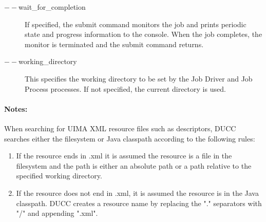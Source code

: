 \begin{description}
           \item[$--$wait\_for\_completion ]             
             If specified, the submit command monitors the job and prints periodic
             state and progress information to the console.  When the job completes, the monitor
             is terminated and the submit command returns.
             
           \item[$--$working\_directory ]             
             This specifies the working directory to be set by the Job Driver and Job Process processes. 
             If not specified, the current directory is used.
  \end{description}
             
  \paragraph{Notes:}
  \label{par:cli.submit.notes}
  When searching for UIMA XML resource files such as descriptors, DUCC searches either the 
  filesystem or Java classpath according to the following rules:
  \begin{enumerate}
    \item If the resource ends in .xml it is assumed the resource is a file in the filesystem 
      and the path is either an absolute path or a path relative to the specified working directory.
    \item If the resource does not end in .xml, it is assumed the resource is in the Java
      classpath. DUCC creates a resource name by replacing the "." separators with "/" and appending ".xml".
  \end{enumerate}
